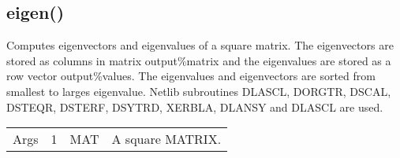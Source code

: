 \subsection{eigen()}
\label{eigen}
Computes eigenvectors and eigenvalues of a square matrix. The eigenvectors are stored as
columns in matrix output\%matrix and the eigenvalues are stored as a row vector
 output\%values. The eigenvalues and eigenvectors are sorted from smallest to larges eigenvalue.
Netlib subroutines DLASCL, DORGTR, DSCAL, DSTEQR, DSTERF, DSYTRD,
XERBLA, DLANSY and DLASCL are used.
\begin{table}[H]
\begin{tabular}{ m{}  m{}m{}p{}}
Args&1&MAT& A square MATRIX.
\\ \cline{1-4}
\end{tabular}
\end{table}
